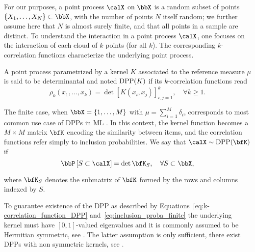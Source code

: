 \documentclass[twoside,11pt]{article}
\begin{document}
    For our purposes, a point process $\calX$ on $\bbX$ is a random subset of points $\lrcb{X_1, \dots, X_N} \subset \bbX$, with the number of points $N$ itself random; we further assume here that $N$ is almost surely finite, and that all points in a sample are distinct.
    To understand the interaction in a point process $\calX$, one focuses on the interaction of each cloud of $k$ points (for all $k$). 
    The corresponding $k$-correlation functions characterize the underlying point process.

    A point process parametrized by a kernel $K$ associated to the reference measure $\mu$ is said to be determinantal and noted $\operatorname{DPP}(K)$ if its $k$-correlation functions read
    \begin{equation}
    \label{eq:k-correlation_function_DPP}
      \rho_k(x_1,\dots,x_k)
        = \det [K(x_i, x_j)]_{i,j=1}^k,
      \quad \forall k\geq 1.
    \end{equation}

    The finite case, when $\bbX = \lrcb{1,\dots,M}$ with $\mu=\sum_{i=1}^M \delta_i$, corresponds to most common use case of DPPs in ML \citep{KuTa12}.
    In this context, the kernel function becomes a $M\times M$ matrix $\bfK$ encoding the similarity between items, and the correlation functions refer simply to inclusion probabilities.
    We say that $\calX\sim \DPP(\bfK)$ if
    \begin{equation}
    \label{eq:inclusion_proba_finite}
      \Proba{S \subset \calX} = \det \bfK_S,
        \quad\forall S\subset \bbX,
    \end{equation}

    where $\bfK_S$ denotes the submatrix of $\bfK$ formed by the rows and columns indexed by $S$.

    To guarantee existence of the DPP as described by Equations~\ref{eq:k-correlation_function_DPP} and~\ref{eq:inclusion_proba_finite} the underlying kernel must have $[0,1]$-valued eigenvalues and it is commonly assumed to be Hermitian symmetric, see \citep[Theorem 3]{Sos00}.
    The latter assumption is only sufficient, there exist DPPs with non symmetric kernels, see \citep{BoDiFu09}.
\end{document}
